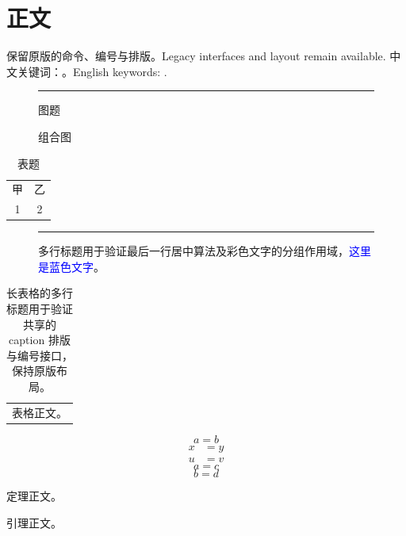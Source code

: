 \section{正文}\label{section}
保留原版的命令、编号与排版。Legacy interfaces and layout remain available.
\ifdefined\HitBook
  \makeatletter 中文关键词：\hit@ckeywords。English keywords: \hit@ekeywords.\makeatother
\fi
\begin{figure}[htbp]\centering\rule{20mm}{4mm}\caption{图题}\label{figure}\end{figure}
\begin{figure}[htbp]\centering
  \subfigure[子图]{\rule{20mm}{3mm}\label{panel}}\caption{组合图}\label{panels}
\end{figure}
\begin{table}[htbp]\caption{表题}\label{table}\begin{tabular}{cc}甲&乙\\1&2\end{tabular}\end{table}
\begin{figure}[htbp]\centering
  \begin{minipage}{65mm}
    \rule{20mm}{3mm}
    \caption{多行标题用于验证最后一行居中算法及彩色文字的分组作用域，\textcolor{blue}{这里是蓝色文字}。}
    \label{long-figure}
  \end{minipage}
\end{figure}
\begin{longtable}{p{65mm}}
  \caption{长表格的多行标题用于验证共享的 caption 排版与编号接口，保持原版布局。}\label{long-table}\\
  表格正文。\\
\end{longtable}
\begin{equation}a=b\label{equation}\end{equation}
\begin{align}x&=y\label{align-a}\\u&=v\label{align-b}\end{align}
\ifdefined\HitTags
  \begin{equation}a=c\tag{S}\label{tagged}\end{equation}
  \begin{equation}b=d\tag*{T}\label{bare}\end{equation}
\fi
\begin{theorem}\label{theorem}定理正文。\end{theorem}
\begin{lemma}[测试]\label{lemma}引理正文。\end{lemma}
